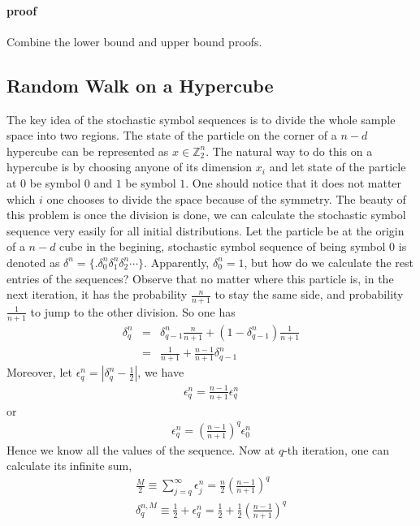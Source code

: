 \documentclass{article}
\begin{document}
\paragraph{proof} Combine the lower bound and upper bound proofs. 


\subsection{Random Walk on a Hypercube}
The key idea of the stochastic symbol sequences is to divide the whole sample space into two regions. The state of the particle on the corner of a $n-d$ hypercube can be represented as $x\in \mathbb{Z}^n_2$. The natural way to do this on a hypercube is by choosing anyone of its dimension $x_i$ and let state of the particle at $0$ be symbol $0$ and $1$ be symbol $1$. One should notice that it does not matter which $i$ one chooses to divide the space because of the symmetry. The beauty of this problem is once the division is done, we can calculate the stochastic symbol sequence very easily for all initial distributions. Let the particle be at the origin of a $n-d$ cube in the begining, stochastic symbol sequence of being symbol $0$ is denoted as $\delta^n = \{.\delta^n_0 \delta^n_1 \delta^n_2 \cdots  \}$. Apparently, $\delta^n_0 = 1$, but how do we calculate the rest entries of the sequences? Observe that no matter where this particle is, in the next iteration, it has the probability $\frac{n}{n+1}$ to stay the same side, and probability $\frac{1}{n+1}$ to jump to the other division. So one has
\begin{eqnarray}
   \delta^n_q &=& \delta^n_{q-1} \frac{n}{n+1} + (1-  \delta^n_{q-1}) \frac{1}{n+1} \nonumber\\
              &=&  \frac{1}{n+1} + \frac{n-1}{n+1}\delta^n_{q-1}
\end{eqnarray} 
Moreover, let $\epsilon^n_q = |\delta^n_q-\frac{1}{2}|$, we have
\begin{eqnarray}
  \epsilon^n_q =  \frac{n-1}{n+1}\epsilon^n_q
\end{eqnarray}
or 
\begin{eqnarray} 
  \epsilon^n_q =  \left(\frac{n-1}{n+1}\right)^q \epsilon^n_0
\end{eqnarray}
Hence we know all the values of the sequence. Now at $q$-th iteration, one can calculate its infinite sum, 
\begin{eqnarray} 
  \frac{M}{2} \equiv \sum_{j=q}^\infty \epsilon^n_j =  \frac{n}{2}\left( \frac{n-1}{n+1}\right)^q\\
  \delta^{n,M}_q \equiv \frac{1}{2}+ \epsilon^n_q = \frac{1}{2} +\frac{1}{2} \left(\frac{n-1}{n+1}\right)^q
\end{eqnarray}
\end{document}
